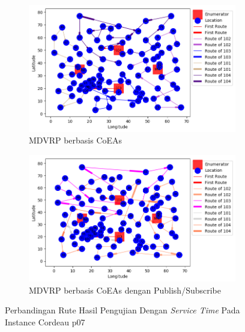 \begin{figure}[H]
	\centering
	\begin{subfigure}[t]{\textwidth}
		\centering
		\includegraphics[width=\textwidth]{Resources/Images/cordeau_p07_tw/cordeau_p07_tw_coes}
		\caption{MDVRP berbasis CoEAs}
		\label{fig:cordeau_p07_tw_coes}
	\end{subfigure}
	\begin{subfigure}[t]{\textwidth}
		\centering
		\includegraphics[width=\textwidth]{Resources/Images/cordeau_p07_tw/cordeau_p07_tw_pubsub_coes}
		\caption{MDVRP berbasis CoEAs dengan Publish/Subscribe}
		\label{fig:cordeau_p07_tw_pubsub_coes}
	\end{subfigure}
	\caption{Perbandingan Rute Hasil Pengujian Dengan \textit{Service Time} Pada Instance Cordeau p07}
	\label{fig:cordeau_p07_tw}
\end{figure}


